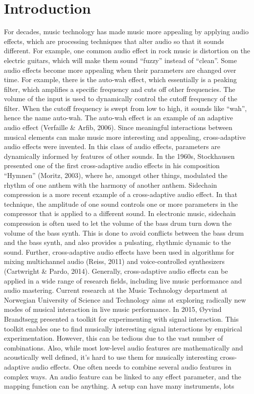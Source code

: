 \section*{Introduction}
For decades, music technology has made music more appealing by applying audio effects, which are processing techniques that alter audio so that it sounds different. For example, one common audio effect in rock music is distortion on the electric guitars, which will make them sound “fuzzy” instead of “clean”. Some audio effects become more appealing when their parameters are changed over time. For example, there is the auto-wah effect, which essentially is a peaking filter, which amplifies a specific frequency and cuts off other frequencies. The volume of the input is used to dynamically control the cutoff frequency of the filter. When the cutoff frequency is swept from low to high, it sounds like “wah”, hence the name auto-wah. The auto-wah effect is an example of an adaptive audio effect (Verfaille \& Arfib, 2006). Since meaningful interactions between musical elements can make music more interesting and appealing, cross-adaptive audio effects were invented. In this class of audio effects, parameters are dynamically informed by features of other sounds. In the 1960s, Stockhausen presented one of the first cross-adaptive audio effects in his composition “Hymnen” (Moritz, 2003), where he, amongst other things, modulated the rhythm of one anthem with the harmony of another anthem. Sidechain compression is a more recent example of a cross-adaptive audio effect. In that technique, the amplitude of one sound controls one or more parameters in the compressor that is applied to a different sound. In electronic music, sidechain compression is often used to let the volume of the bass drum turn down the volume of the bass synth. This is done to avoid conflicts between the bass drum and the bass synth, and also provides a pulsating, rhythmic dynamic to the sound. Further, cross-adaptive audio effects have been used in algorithms for mixing multichannel audio (Reiss, 2011) and voice-controlled synthesizers (Cartwright \& Pardo, 2014). Generally, cross-adaptive audio effects can be applied in a wide range of research fields, including live music performance and audio mastering. Current research at the Music Technology department at Norwegian University of Science and Technology aims at exploring radically new modes of musical interaction in live music performance. In 2015, Øyvind Brandtsegg presented a toolkit for experimenting with signal interaction. This toolkit enables one to find musically interesting signal interactions by empirical experimentation. However, this can be tedious due to the vast number of combinations. Also, while most low-level audio features are mathematically and acoustically well defined, it’s hard to use them for musically interesting cross-adaptive audio effects. One often needs to combine several audio features in complex ways. An audio feature can be linked to any effect parameter, and the mapping function can be anything. A setup can have many instruments, lots 